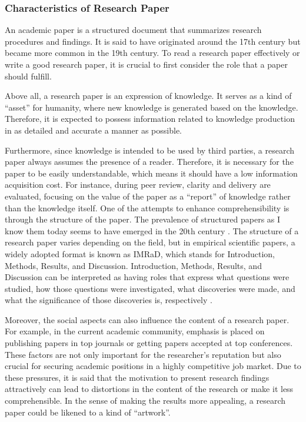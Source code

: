 \documentclass{article}
\begin{document}
\subsubsection{Characteristics of Research Paper}
An academic paper is a structured document that summarizes research procedures and findings. It is said to have originated around the 17th century but became more common in the 19th century. To read a research paper effectively or write a good research paper, it is crucial to first consider the role that a paper should fulfill. 

Above all, a research paper is an expression of knowledge. It serves as a kind of ``asset'' for humanity, where new knowledge is generated based on the knowledge. Therefore, it is expected to possess information related to knowledge production in as detailed and accurate a manner as possible.

Furthermore, since knowledge is intended to be used by third parties, a research paper always assumes the presence of a reader. Therefore, it is necessary for the paper to be easily understandable, which means it should have a low information acquisition cost. For instance, during peer review, clarity and delivery are evaluated, focusing on the value of the paper as a ``report'' of knowledge rather than the knowledge itself. One of the attempts to enhance comprehensibility is through the structure of the paper. The prevalence of structured papers as I know them today seems to have emerged in the 20th century \cite{harmon1989structure}. 
The structure of a research paper varies depending on the field, but in empirical scientific papers, a widely adopted format is known as IMRaD, which stands for Introduction, Methods, Results, and Discussion. Introduction, Methods, Results, and Discussion can be interpreted as having roles that express what questions were studied, how those questions were investigated, what discoveries were made, and what the significance of those discoveries is, respectively \cite{gastel2022write}.

Moreover, the social aspects can also influence the content of a research paper. For example, in the current academic community, emphasis is placed on publishing papers in top journals or getting papers accepted at top conferences. These factors are not only important for the researcher's reputation but also crucial for securing academic positions in a highly competitive job market. Due to these pressures, it is said that the motivation to present research findings attractively can lead to distortions in the content of the research or make it less comprehensible. In the sense of making the results more appealing, a research paper could be likened to a kind of ``artwork''.
\end{document}
